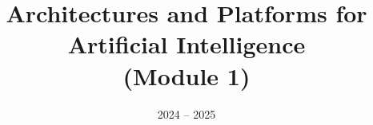 \documentclass[11pt]{ainotes}
\title{Architectures and Platforms for\\Artificial Intelligence\\(Module 1)}
\date{2024 -- 2025}
\begin{document}
    \makenotesfront
    
\end{document}
